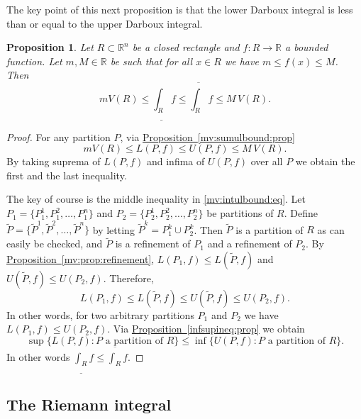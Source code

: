 \documentclass[12pt]{book}
\newcommand{\R}{{\mathbb{R}}}
\theoremstyle{plain}
\newtheorem{prop}[thm]{Proposition}
\theoremstyle{remark}
\theoremstyle{definition}
\theoremstyle{exercise}
\theoremstyle{example}
\newcommand{\propref}[1]{\hyperref[#1]{Proposition~\ref*{#1}}}
\begin{document}
The key point of this next proposition is that
the lower Darboux integral is less than or equal to the upper Darboux
integral.

\begin{prop} \label{mv:intulbound:prop}
Let $R \subset \R^n$ be a closed rectangle and
$f \colon R \to \R$ a bounded function.  Let $m, M \in \R$ be 
such that for all $x \in R$ we have $m \leq f(x) \leq M$.  Then
\begin{equation}
\label{mv:intulbound:eq}
m V(R) \leq
\underline{\int_R} f \leq \overline{\int_R} f
\leq M \, V(R).
\end{equation}
\end{prop}

\begin{proof}
For any partition $P$, via \propref{mv:sumulbound:prop}
\begin{equation*}
mV(R) \leq L(P,f) \leq U(P,f) \leq M\,V(R).
\end{equation*}
By taking suprema of $L(P,f)$ and infima of $U(P,f)$ over all $P$
we obtain the first and the last inequality.

The key of course is the middle inequality in
\eqref{mv:intulbound:eq}.
Let $P_1 = \{ P_1^1,P_1^2,\ldots,P_1^n \}$ and
$P_2 = \{ P_2^1,P_2^2,\ldots,P_2^n \}$
be partitions of $R$.  Define 
$\tilde{P} = \{ \tilde{P}^1,\tilde{P}^2,\ldots,\tilde{P}^n \}$
by letting
$\tilde{P}^k = P_1^k \cup P_2^k$.
Then $\tilde{P}$ is a partition of $R$ as can easily be checked,
and $\tilde{P}$ is a refinement of $P_1$ and a refinement of $P_2$.
By \propref{mv:prop:refinement},
$L(P_1,f) \leq L(\tilde{P},f)$ and
$U(\tilde{P},f) \leq U(P_2,f)$.  Therefore,
\begin{equation*}
L(P_1,f) \leq L(\tilde{P},f) \leq U(\tilde{P},f) \leq U(P_2,f) .
\end{equation*}
In other words, for two arbitrary partitions $P_1$ and $P_2$ we have
$L(P_1,f) \leq U(P_2,f)$.  
Via \propref{infsupineq:prop} we obtain
\begin{equation*}
\sup \{ L(P,f) : \text{$P$ a partition of $R$} \}
\leq
\inf \{ U(P,f) : \text{$P$ a partition of $R$} \} .
\end{equation*}
In other words $\underline{\int_R} f \leq \overline{\int_R} f$.
\end{proof}

\subsection{The Riemann integral}
\end{document}
